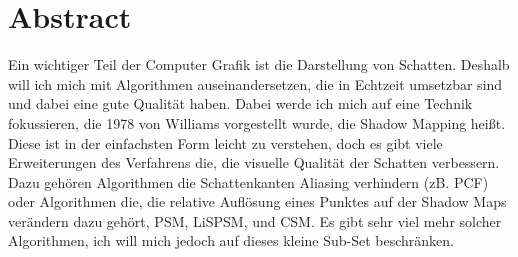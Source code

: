 \documentclass{thesisclass}
\let\cleardoublepage\clearpage
\begin{document}

\frontmatter
{}

\blankpage

\chapter*{Abstract}
Ein wichtiger Teil der Computer Grafik ist die Darstellung von Schatten.
Deshalb will ich mich mit Algorithmen auseinandersetzen,
die in Echtzeit umsetzbar sind und dabei eine gute Qualität haben.
Dabei werde ich mich auf eine Technik fokussieren, die 1978 von Williams vorgestellt wurde, die \glqq{}Shadow Mapping\grqq{} heißt.
Diese ist in der einfachsten Form leicht zu verstehen, doch es gibt viele 
Erweiterungen des Verfahrens die, die visuelle Qualität 
der Schatten verbessern. 
Dazu gehören Algorithmen die Schattenkanten Aliasing verhindern (zB. PCF) oder 
Algorithmen die, die relative Auflösung eines Punktes auf der Shadow Maps verändern dazu gehört, 
PSM, LiSPSM, und CSM. Es gibt sehr viel mehr solcher Algorithmen, ich will mich jedoch auf dieses kleine Sub-Set beschränken.

%
%


\tableofcontents
\blankpage

\mainmatter
{}




\cleardoublepage
{}
{}

{}	%
{}	%
												  



\end{document}
